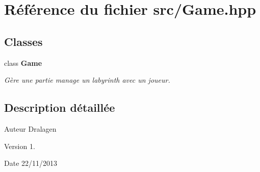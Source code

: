 \section{Référence du fichier src/\-Game.hpp}
\label{_game_8hpp}
\subsection*{Classes}
\begin{DoxyCompactItemize}
\item 
class {\bf Game}
\begin{DoxyCompactList}\small\item\em Gère une partie manage un labyrinth avec un joueur. \end{DoxyCompactList}\end{DoxyCompactItemize}


\subsection{Description détaillée}
\begin{DoxyAuthor}{Auteur}
Dralagen 
\end{DoxyAuthor}
\begin{DoxyVersion}{Version}
1. 
\end{DoxyVersion}
\begin{DoxyDate}{Date}
22/11/2013 
\end{DoxyDate}
